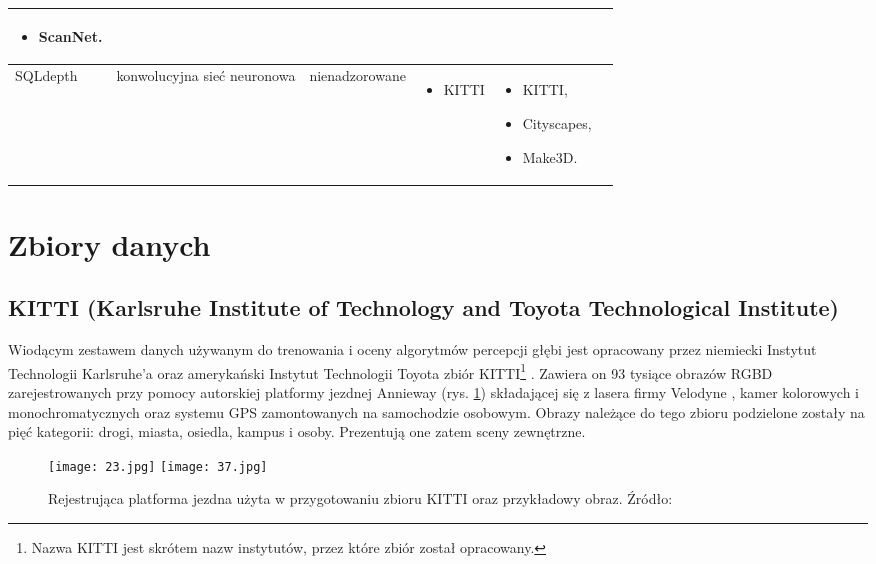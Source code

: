 \begin{table}[H]
{\begin{tabular}{ |l|p{2cm}|p{3cm}|p{5cm}|p{5cm}|r| }
\begin{itemize}
            \item ScanNet.
        \end{itemize}\\
        \hline
        SQLdepth \cite{wang2023sqldepth} &
        konwolucyjna sieć neuronowa &
        nienadzorowane &
        \begin{itemize}
            \item KITTI
        \end{itemize} & 
        \begin{itemize}
            \item KITTI,
            \item Cityscapes,
            \item Make3D.
        \end{itemize}\\
        \hline
        \end{tabular}%
    }
    \label{tabela_podsumowanie_algorytmy_2}
\end{table}

\section{Zbiory danych}
\subsection{KITTI (Karlsruhe Institute of Technology and Toyota Technological Institute)}
Wiodącym zestawem danych używanym do trenowania i oceny algorytmów percepcji głębi jest opracowany przez niemiecki Instytut Technologii Karlsruhe'a oraz amerykański Instytut Technologii Toyota zbiór KITTI\footnote{Nazwa KITTI jest skrótem nazw instytutów, przez które zbiór został opracowany.} \cite{geiger2012}. Zawiera on 93 tysiące obrazów RGBD zarejestrowanych przy pomocy autorskiej platformy jezdnej Annieway (rys. \ref{fig:kitti-annieway-example}) składającej się z lasera firmy Velodyne \cite{Velodyne}, kamer kolorowych i monochromatycznych oraz systemu GPS zamontowanych na samochodzie osobowym. Obrazy należące do tego zbioru podzielone zostały na pięć kategorii: drogi, miasta, osiedla, kampus i osoby. Prezentują one zatem sceny zewnętrzne.
\begin{figure}[H]
    \centering
    \texttt{[image: 23.jpg]}
    \texttt{[image: 37.jpg]}
    \caption{Rejestrująca platforma jezdna użyta w przygotowaniu zbioru KITTI oraz przykładowy obraz. Źródło: \cite{geiger2012}}
    \label{fig:kitti-annieway-example}
\end{figure}

